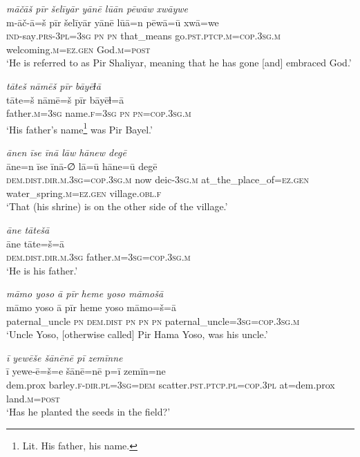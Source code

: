 \ea \label{ŽP.3}
\textit{māčāš pīr šelīyār yānē lūān pēwāw xwāywe} \\ 
\gll m-āč-ā=š pīr šelīyār yānē lūā=n pēwā=ū xwā=we \\ 
 \textsc{ind-}say\textsc{.prs}\textsc{-3pl}\textsc{=3sg} \textsc{pn} \textsc{pn} that\_means go\textsc{.pst}\textsc{.ptcp}\textsc{.m}\textsc{=cop}\textsc{.3sg}\textsc{.m} welcoming\textsc{.m}\textsc{\textsc{=ez.gen}} God\textsc{.m}\textsc{=\textsc{post}} \\ 
\glt `He is referred to as Pir Shaliyar, meaning that he has gone [and] embraced God.'
\z 
 
\ea \label{ŽP.5}
\textit{tāteš nāmēš pīr bāyēɫā} \\ 
\gll tāte=š nāmē=š pīr bāyēɫ=ā \\ 
 father\textsc{.m}\textsc{=3sg} name\textsc{.f}\textsc{=3sg} \textsc{pn} \textsc{pn}\textsc{=cop}\textsc{.3sg}\textsc{.m} \\ 
\glt `His father’s name\footnote{Lit. His father, his name.} was Pir Bayel.'
\z 
 
\ea \label{ŽP.6}
\textit{ānen īse īnā lāw hānew degē} \\ 
\gll āne=n īse īnā-∅ lā=ū hāne=ū degē \\ 
 \textsc{dem.dist}\textsc{.dir}\textsc{.m}\textsc{.3sg}\textsc{=cop}\textsc{.3sg}\textsc{.m} now deic\textsc{-3sg}\textsc{.m} at\_the\_place\_of\textsc{\textsc{=ez.gen}} water\_spring\textsc{.m}\textsc{\textsc{=ez.gen}} village\textsc{.obl}\textsc{.f} \\ 
\glt `That (his shrine) is on the other side of the village.'
\z 
 
\ea \label{ŽP.7}
\textit{āne tātešā} \\ 
\gll āne tāte=š=ā \\ 
 \textsc{dem.dist}\textsc{.dir}\textsc{.m}\textsc{.3sg} father\textsc{.m}\textsc{=3sg}\textsc{=cop}\textsc{.3sg}\textsc{.m} \\ 
\glt `He is his father.'
\z 
 
\ea \label{ŽP.12}
\textit{māmo yoso ā pīr heme yoso māmošā} \\ 
\gll māmo yoso ā pīr heme yoso māmo=š=ā \\ 
 paternal\_uncle \textsc{pn} \textsc{dem.dist} \textsc{pn} \textsc{pn} \textsc{pn} paternal\_uncle\textsc{=3sg}\textsc{=cop}\textsc{.3sg}\textsc{.m} \\ 
\glt `Uncle Yoso, [otherwise called] Pir Hama Yoso, was his uncle.'
\z 
 
\ea \label{ŽP.44}
\textit{ī yewēše šānēnē pī zemīnne} \\ 
\gll ī yewe-ē=š=e šānē=nē p=ī zemīn=ne \\ 
 dem.prox barley\textsc{.f}\textsc{-dir}\textsc{.pl}\textsc{=3sg}\textsc{=dem} scatter\textsc{.pst}\textsc{.ptcp}\textsc{.pl}\textsc{=cop}\textsc{.3pl} at=dem.prox land\textsc{.m}\textsc{=\textsc{post}} \\ 
\glt `Has he planted the seeds in the field?'
\z 
 
